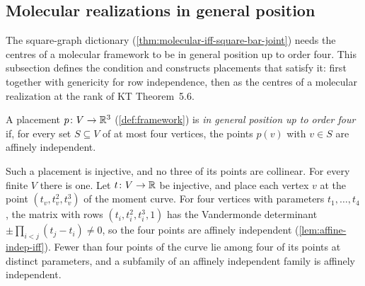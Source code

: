 \subsection{Molecular realizations in general position}
\label{sec:molecule-modelling-general-position}

The square-graph dictionary (\cref{thm:molecular-iff-square-bar-joint})
needs the centres of a molecular framework to be in general position up
to order four. This subsection defines the condition and constructs
placements that satisfy it: first together with genericity for row
independence, then as the centres of a molecular realization at the rank
of KT Theorem~5.6.

\begin{definition}
  \label{def:general-position-placement}
  \leanok
  A placement $p \colon V \to {\mathbb{R}}^3$ (\cref{def:framework}) is \emph{in
  general position up to order four} if, for every set $S \subseteq V$
  of at most four vertices, the points $p(v)$ with $v \in S$ are
  affinely independent.
\end{definition}

Such a placement is injective, and no three of its points are
collinear. For every finite $V$ there is one. Let $t \colon V \to {\mathbb{R}}$
be injective, and place each vertex $v$ at the point
$(t_v, t_v^2, t_v^3)$ of the moment curve. For four vertices with
parameters $t_1, \dots, t_4$, the matrix with rows
$(t_i, t_i^2, t_i^3, 1)$ has the Vandermonde determinant
$\pm\prod_{i < j} (t_j - t_i) \neq 0$, so the four points are affinely
independent (\cref{lem:affine-indep-iff}). Fewer than four points of the
curve lie among four of its points at distinct parameters, and a
subfamily of an affinely independent family is affinely independent.

